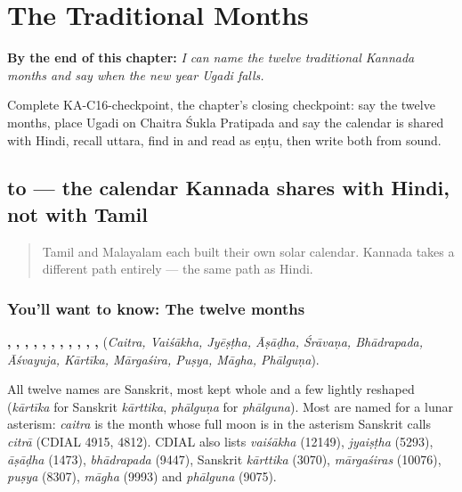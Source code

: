 
\chapter{The Traditional Months}
\label{ch:ka-traditional-months}

\begin{chapteropening}
\textbf{By the end of this chapter:} \emph{I can name the twelve traditional Kannada months and say when the new year Ugadi falls.}

Complete KA-C16-checkpoint, the chapter's closing checkpoint: say the twelve months, place Ugadi on Chaitra Śukla Pratipada and say the calendar is shared with Hindi, recall uttara, find  in  and read  as eṇṭu, then write both from sound.
\end{chapteropening}

\section[\texorpdfstring{\kn{ಚೈತ್ರ} \kn{ವೈಶಾಖ} \kn{ಜ್ಯೇಷ್ಠ} … (caitra vaiśākha …)}{ಚೈತ್ರ ವೈಶಾಖ ಜ್ಯೇಷ್ಠ … (caitra vaiśākha …)}]{ to  — the calendar Kannada shares with Hindi, not with Tamil}

\label{lesson:KA-C16-tingalugalu}



\begin{quote}
Tamil and Malayalam each built their own solar calendar. Kannada takes a different path entirely — the same path as Hindi.
\end{quote}

\subsection*{You'll want to know: The twelve months}
\textbf{, , , , , , , , , , , } (\emph{Caitra, Vaiśākha, Jyēṣṭha, Āṣāḍha, Śrāvaṇa, Bhādrapada, Āśvayuja, Kārtīka, Mārgaśira, Puṣya, Māgha, Phālguṇa}).

\begin{cousinweb}
All twelve names are Sanskrit, most kept whole and a few lightly reshaped (\emph{kārtīka} for Sanskrit \emph{kārttika}, \emph{phālguṇa} for \emph{phālguna}). Most are named for a lunar asterism: \emph{caitra} is the month whose full moon is in the asterism Sanskrit calls \emph{citrā} (CDIAL 4915, 4812). CDIAL also lists \emph{vaiśākha} (12149), \emph{jyaiṣṭha} (5293), \emph{āṣāḍha} (1473), \emph{bhādrapada} (9447), Sanskrit \emph{kārttika} (3070), \emph{mārgaśiras} (10076), \emph{puṣya} (8307), \emph{māgha} (9993) and \emph{phālguna} (9075).
\end{cousinweb}

